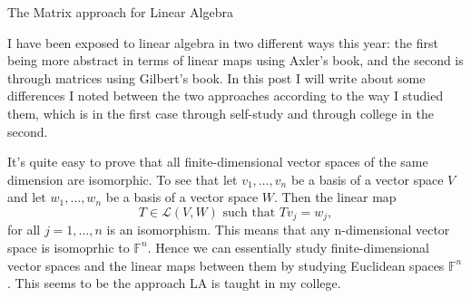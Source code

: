 \begin{entry}[2]{The Matrix approach for Linear Algebra}

\begin{entrysection}
I have been exposed to linear algebra in two different ways this year: the first being more abstract in terms of linear maps using Axler's book, and the second is through matrices using Gilbert's book. In this post I will write about some differences I noted between the two approaches according to the way I studied them, which is in the first case through self-study and through college in the second.
\end{entrysection}

\begin{entrysection}
It's quite easy to prove that all finite-dimensional vector spaces of the same dimension are isomorphic. To see that let $v_1,\ldots,v_n$ be a basis of a vector space $V$ and let $w_1,\ldots,w_n$ be a basis of a vector space $W$. Then the linear map
\[ T \in  \mathcal{L}(V, W) \text{ such that } Tv_j = w_j, \]
for all $j = 1,\ldots,n$ is an isomorphism. This means that any n-dimensional vector space is isomoprhic to $\mathbb{F}^n$. Hence we can essentially study finite-dimensional vector spaces and the linear maps between them by studying Euclidean spaces $\mathbb{F}^n$. This seems to be the approach LA is taught in my college.
\end{entrysection}


\end{entry}
